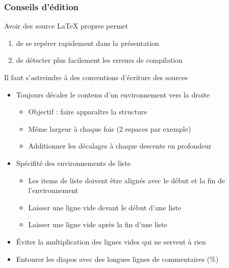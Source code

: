 
\begin{frame}[fragile]
  \frametitle{Conseils d'édition}

  Avoir des source \LaTeX{} propres permet 

  \begin{enumerate}
  \item de se repérer rapidement dans la présentation
  \item de détecter plus facilement les erreurs de compilation
  \end{enumerate}

  \alert{Il faut s'astreindre à des conventions d'écriture des sources}

  \pause

  \begin{itemize}
  \item Toujours décaler le contenu d'un environnement vers la droite

    \begin{itemize}
    \item Objectif : faire apparaître la structure
    \item Même largeur à chaque fois (2 espaces par exemple)
    \item Additionner les décalages à chaque descente en profondeur      
    \end{itemize}

  \item Spécifité des environnements de liste

    \begin{itemize}
    \item Les items de liste doivent être alignés avec le début et la fin de l'environnement
    \item Laisser une ligne vide devant le début d'une liste
    \item Laisser une ligne vide après la fin d'une liste
    \end{itemize}

  \item Éviter la multiplication des lignes vides qui ne servent à rien
  \item Entourer les diapos avec des longues lignes de commentaires (\%)
  \end{itemize}
\end{frame}

